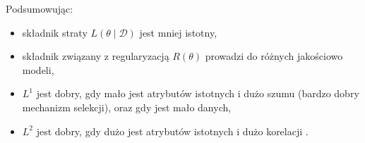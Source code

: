 \documentclass[wi]{zut}
\begin{document}
Podsumowując:

\begin{itemize}
    \item składnik straty $L(\theta \mid \mathscr{D})$ jest mniej istotny,
    \item składnik związany z regularyzacją $R(\theta)$ prowadzi do różnych jakościowo modeli,
    \item $L^1$ jest dobry, gdy mało jest atrybutów istotnych i dużo szumu (bardzo dobry mechanizm selekcji), oraz gdy jest mało danych,
    \item $L^2$ jest dobry, gdy dużo jest atrybutów istotnych i dużo korelacji \cite{Korzen2020_12}.
\end{itemize}

\printbibliography[heading=bibintoc]





\end{document}
